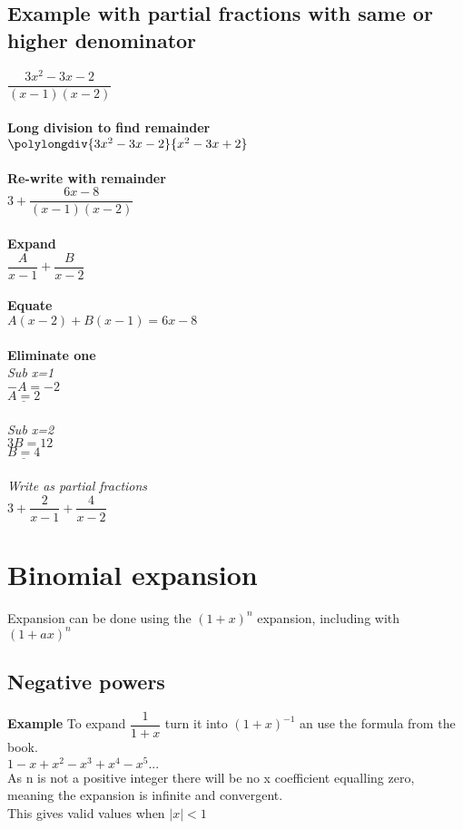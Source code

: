 \documentclass{article}[18pt]
\begin{document}
\subsection{Example with partial fractions with same or higher denominator}
$\dfrac{3x^2-3x-2}{(x-1)(x-2)}$\\
\\
\textbf{Long division to find remainder}\\
$\polylongdiv{3x^2-3x-2}{x^2-3x+2}$\\
\\
\textbf{Re-write with remainder}\\
$3+\dfrac{6x-8}{(x-1)(x-2)}$\\
\\
\textbf{Expand}\\
$\dfrac{A}{x-1}+\dfrac{B}{x-2}$\\
\\
\textbf{Equate}\\
$A(x-2)+B(x-1)=6x-8$\\
\\
\textbf{Eliminate one}\\
\textit{Sub x=1}\\
$-A=-2$\\
$\underline{A=2}$\\
\\
\textit{Sub x=2}\\
$3B=12$\\
$\underline{B=4}$\\
\\
\textit{Write as partial fractions}\\
$3+\dfrac{2}{x-1}+\dfrac{4}{x-2}$
\section{Binomial expansion}
Expansion can be done using the $(1+x)^n$ expansion, including with $(1+ax)^n$
\subsection{Negative powers}
\textbf{Example}
To expand $\dfrac{1}{1+x}$ turn it into $(1+x)^{-1}$ an use the formula from the book.\\
$1-x+x^2-x^3+x^4-x^5...$\\
As n is not a positive integer there will be no x coefficient equalling zero, meaning the expansion is infinite and convergent.\\
This gives valid values when $|x|<1$
\end{document}
